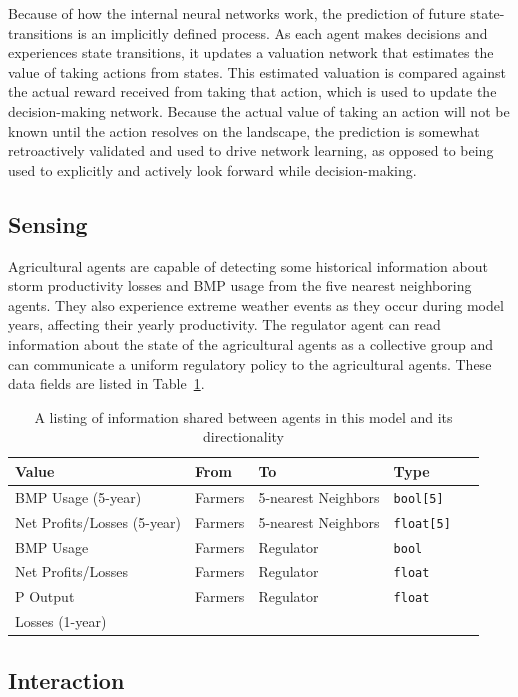 Because of how the internal neural networks work, the prediction of future state-transitions is an implicitly defined process. As each agent makes decisions and experiences state transitions, it updates a valuation network that estimates the value of taking actions from states. This estimated valuation is compared against the actual reward received from taking that action, which is used to update the decision-making network. Because the actual value of taking an action will not be known until the action resolves on the landscape, the prediction is somewhat retroactively validated and used to drive network learning, as opposed to being used to explicitly and actively look forward while decision-making.

\subsection{Sensing}
\label{sec:farm_sensing}

Agricultural agents are capable of detecting some historical information about storm productivity losses and BMP usage from the five nearest neighboring agents. They also experience extreme weather events as they occur during model years, affecting their yearly productivity.
The regulator agent can read information about the state of the agricultural agents as a collective group and can communicate a uniform regulatory policy to the agricultural agents.
These data fields are listed in Table~\ref{tab:app_farm_sensing}.

\begin{longtable}{lllll}
\caption[Table listing information shared between agents in the farm model]{A listing of information shared between agents in this model and its directionality}\label{tab:app_farm_sensing} \\
\hline\hline
Value & From & To & Type \\
\hline
\endhead
\hline\endfoot
BMP Usage (5-year) & Farmers & 5-nearest Neighbors & \tt{bool[5]} \\
Net Profits/Losses (5-year) & Farmers & 5-nearest Neighbors & \tt{float[5]} \\
BMP Usage & Farmers & Regulator & \tt{bool} \\
Net Profits/Losses & Farmers & Regulator & \tt{float} \\
P Output & Farmers & Regulator & \tt{float} \\
Losses (1-year) & 
\end{longtable}

\subsection{Interaction}


